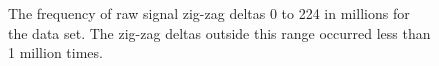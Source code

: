 \begin{figure}
	\centering

	\caption{\label{fig:zd-hist}The frequency of raw signal zig-zag deltas 0 to 224 in millions for the data set. The zig-zag deltas outside this range occurred less than 1 million times.}
\end{figure}
